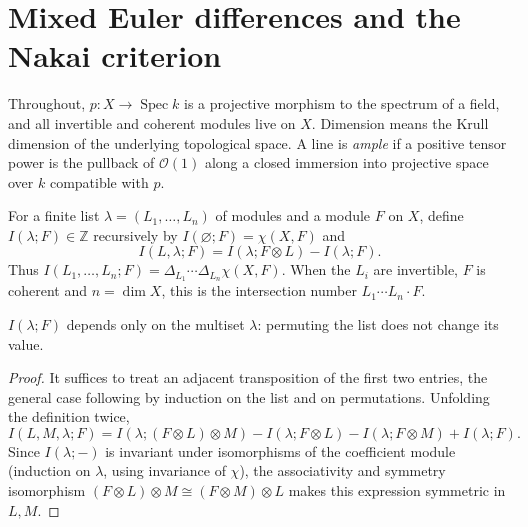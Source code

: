 \section{Mixed Euler differences and the Nakai criterion}
\label{sec:seshadri-nakai-criterion}

Throughout, $p:X\to\operatorname{Spec}k$ is a projective morphism to the spectrum of a field,
and all invertible and coherent modules live on $X$. Dimension means the Krull dimension of
the underlying topological space. A line is \emph{ample} if a positive tensor power is the
pullback of $\mathcal O(1)$ along a closed immersion into projective space over $k$
compatible with $p$.

\begin{definition}
\label{def:seshadri-mixed-euler-difference}
\leanok
For a finite list $\lambda=(L_1,\dots,L_n)$ of modules and a module $F$ on $X$, define
$I(\lambda;F)\in\mathbb Z$ recursively by $I(\varnothing;F)=\chi(X,F)$ and
\[
  I(L,\lambda;F)=I(\lambda;F\otimes L)-I(\lambda;F).
\]
Thus $I(L_1,\dots,L_n;F)=\Delta_{L_1}\cdots\Delta_{L_n}\chi(X,F)$. When the $L_i$ are
invertible, $F$ is coherent and $n=\dim X$, this is the intersection number
$L_1\cdots L_n\cdot F$.
\end{definition}

\begin{lemma}
\label{lem:intersection-permutation}
\leanok
{}
$I(\lambda;F)$ depends only on the multiset $\lambda$: permuting the list does not change
its value.
\end{lemma}
\begin{proof}
It suffices to treat an adjacent transposition of the first two entries, the general case
following by induction on the list and on permutations. Unfolding the definition twice,
\[
 I(L,M,\lambda;F)=I(\lambda;(F\otimes L)\otimes M)-I(\lambda;F\otimes L)
   -I(\lambda;F\otimes M)+I(\lambda;F).
\]
Since $I(\lambda;-)$ is invariant under isomorphisms of the coefficient module (induction on
$\lambda$, using invariance of $\chi$), the associativity and symmetry isomorphism
$(F\otimes L)\otimes M\cong(F\otimes M)\otimes L$ makes this expression symmetric in $L,M$.
\end{proof}


